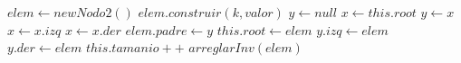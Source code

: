 \begin{algorithmic}[1]
\STATE $elem \leftarrow new Nodo2()$
\STATE $elem.construir(k, valor)$
\STATE $y \leftarrow null$
\STATE $x \leftarrow this.root$
	\STATE $y \leftarrow x$
		\STATE $x \leftarrow x.izq$
	\ELSE
		\STATE $x \leftarrow x.der$
	\ENDIF
\ENDWHILE
\STATE $elem.padre \leftarrow y$
	\STATE $this.root \leftarrow elem$
	\STATE $y.izq \leftarrow elem$
\ELSE
	\STATE $y.der \leftarrow elem$
\ENDIF
\STATE $this.tamanio++$
\STATE $arreglarInv(elem)$
\end{algorithmic}
